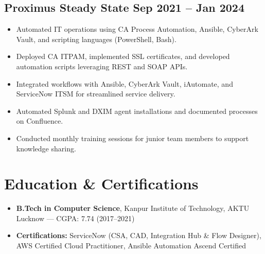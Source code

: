 \documentclass[a4paper,10pt]{article}
\begin{document}
\subsection*{Proximus Steady State \hfill Sep 2021 -- Jan 2024}
\begin{itemize}
    \item Automated IT operations using CA Process Automation, Ansible, CyberArk Vault, and scripting languages (PowerShell, Bash).
    \item Deployed CA ITPAM, implemented SSL certificates, and developed automation scripts leveraging REST and SOAP APIs.
    \item Integrated workflows with Ansible, CyberArk Vault, iAutomate, and ServiceNow ITSM for streamlined service delivery.
    \item Automated Splunk and DXIM agent installations and documented processes on Confluence.
    \item Conducted monthly training sessions for junior team members to support knowledge sharing.
\end{itemize}

\section*{Education \& Certifications}
\begin{itemize}
    \item \textbf{B.Tech in Computer Science}, Kanpur Institute of Technology, AKTU Lucknow — CGPA: 7.74 (2017--2021)
    \item \textbf{Certifications:} ServiceNow (CSA, CAD, Integration Hub \& Flow Designer), AWS Certified Cloud Practitioner, Ansible Automation Ascend Certified
\end{itemize}
\end{document}
